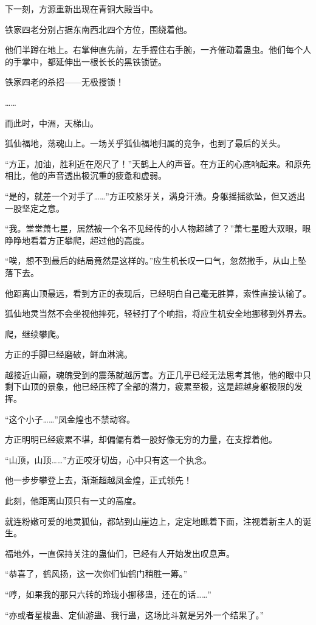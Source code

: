 \begin{this_body}
下一刻，方源重新出现在青铜大殿当中。

铁家四老分别占据东南西北四个方位，围绕着他。

他们半蹲在地上。右掌伸直先前，左手握住右手腕，一齐催动着蛊虫。他们每个人的手掌中，都延伸出一根长长的黑铁锁链。

铁家四老的杀招——无极搜锁！

……

而此时，中洲，天梯山。

狐仙福地，荡魂山上。一场关乎狐仙福地归属的竞争，也到了最后的关头。

“方正，加油，胜利近在咫尺了！”天鹤上人的声音。在方正的心底响起来。和原先相比，他的声音透出极沉重的疲惫和虚弱。

“是的，就差一个对手了……”方正咬紧牙关，满身汗渍。身躯摇摇欲坠，但又透出一股坚定之意。

“我。堂堂萧七星，居然被一个名不见经传的小人物超越了？”萧七星瞪大双眼，眼睁睁地看着方正攀爬，超过他的高度。

“唉，想不到最后的结局竟然是这样的。”应生机长叹一口气，忽然撒手，从山上坠落下去。

他距离山顶最远，看到方正的表现后，已经明白自己毫无胜算，索性直接认输了。

狐仙地灵当然不会坐视他摔死，轻轻打了个响指，将应生机安全地挪移到外界去。

爬，继续攀爬。

方正的手脚已经磨破，鲜血淋漓。

越接近山巅，魂魄受到的震荡就越厉害。方正几乎已经无法思考其他，他的眼中只剩下山顶的景象，他已经压榨了全部的潜力，疲累至极，这是超越身躯极限的发挥。

“这个小子……”凤金煌也不禁动容。

方正明明已经疲累不堪，却偏偏有着一股好像无穷的力量，在支撑着他。

“山顶，山顶……”方正咬牙切齿，心中只有这一个执念。

他一步步攀登上去，渐渐超越凤金煌，正式领先！

此刻，他距离山顶只有一丈的高度。

就连粉嫩可爱的地灵狐仙，都站到山崖边上，定定地瞧着下面，注视着新主人的诞生。

福地外，一直保持关注的蛊仙们，已经有人开始发出叹息声。

“恭喜了，鹤风扬，这一次你们仙鹤门稍胜一筹。”

“哼，如果我的那只六转的玲珑小挪移蛊，还在的话……”

“亦或者星梭蛊、定仙游蛊、我行蛊，这场比斗就是另外一个结果了。”


\end{this_body}
